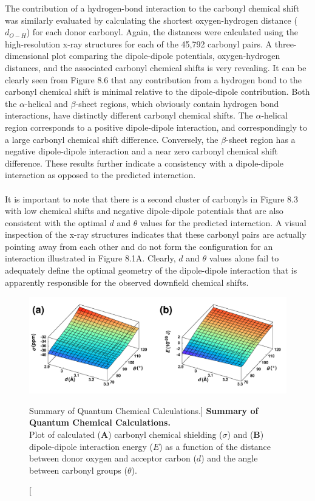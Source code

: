 \begin{doublespace}
The contribution of a hydrogen-bond interaction to the carbonyl \cnmr{}
chemical shift was similarly evaluated by calculating the shortest
oxygen-hydrogen distance ($d_{O-H}$) for each donor carbonyl. Again, the
distances were calculated using the high-resolution x-ray structures for each
of the 45,792 carbonyl pairs. A three-dimensional plot comparing the
dipole-dipole potentials, oxygen-hydrogen distances, and the associated
carbonyl \cnmr{} chemical shifts is very revealing. It can be clearly seen
from Figure 8.6 that any contribution from a hydrogen bond to the \cnmr{}
carbonyl chemical shift is minimal relative to the dipole-dipole contribution.
Both the $\alpha$-helical and $\beta$-sheet regions, which obviously contain
hydrogen bond interactions, have distinctly different \cnmr{} carbonyl chemical
shifts. The $\alpha$-helical region corresponds to a positive dipole-dipole
interaction, and correspondingly to a large carbonyl \cnmr{} chemical shift
difference. Conversely, the $\beta$-sheet region has a negative dipole-dipole
interaction and a near zero carbonyl \cnmr{} chemical shift difference. These
results further indicate a consistency with a dipole-dipole interaction as
opposed to the predicted \npistar{} interaction.
\\\\
It is important to note that there is a second cluster of carbonyls in Figure
8.3 with low \cnmr{} chemical shifts and negative dipole-dipole potentials that
are also consistent with the optimal $d$ and $\theta$ values for the predicted
\npistar{} interaction. A visual inspection of the x-ray structures indicates
that these carbonyl pairs are actually pointing away from each other and do not
form the configuration for an \npistar{} interaction illustrated in Figure
8.1A. Clearly, $d$ and $\theta$ values alone fail to adequately define the
optimal geometry of the dipole-dipole interaction that is apparently
responsible for the observed downfield \cnmr{} chemical shifts.
\end{doublespace}

\begin{figure}[h!]
\includegraphics[width=6.5in]{figs/npistar/07.png}
\caption
      [Summary of Quantum Chemical Calculations.]{
  {\bf Summary of Quantum Chemical Calculations.}
  \\
  Plot of calculated ({\bf A}) carbonyl \cnmr{} chemical shielding ($\sigma$)
  and ({\bf B}) dipole-dipole interaction energy ($E$) as a function of the
  distance between donor oxygen and acceptor carbon ($d$) and the angle
  between carbonyl groups ($\theta$).
}
\end{figure}

